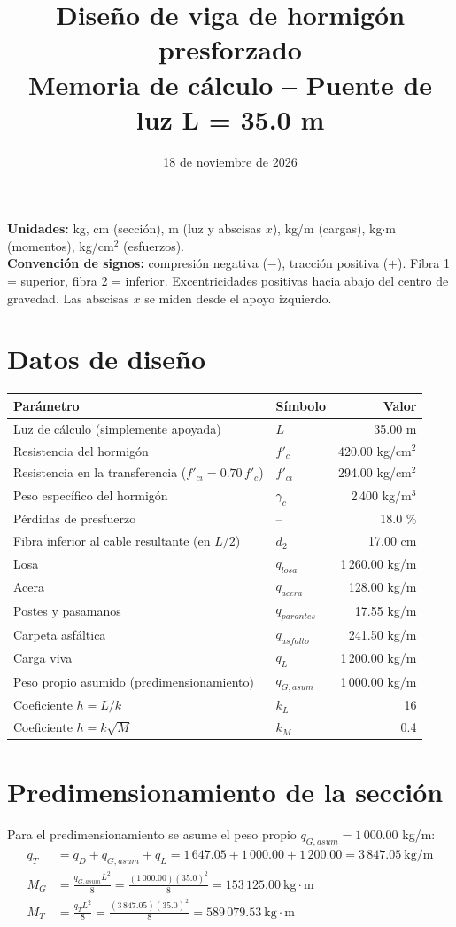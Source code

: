 \documentclass[11pt,a4paper]{article}
\title{\textbf{Diseño de viga de hormigón presforzado}\\[4pt]\large Memoria de cálculo -- Puente de luz L = 35.0 m}
\date{18 de noviembre de 2026}
\author{}
\begin{document}
\maketitle
\thispagestyle{fancy}
\tableofcontents
\newpage
\textbf{Unidades:} kg, cm (sección), m (luz y abscisas $x$), kg/m (cargas), kg$\cdot$m (momentos), kg/cm$^2$ (esfuerzos).\\
\textbf{Convención de signos:} compresión negativa ($-$), tracción positiva ($+$). Fibra 1 = superior, fibra 2 = inferior.
Excentricidades positivas hacia abajo del centro de gravedad. Las abscisas $x$ se miden desde el apoyo izquierdo.


\section{Datos de diseño}
\begin{center}
\begin{tabular}{llr}
\toprule
Parámetro & Símbolo & Valor \\
\midrule
Luz de cálculo (simplemente apoyada) & $L$ & 35.00 m \\
Resistencia del hormigón & $f'_c$ & 420.00 kg/cm$^2$ \\
Resistencia en la transferencia ($f'_{ci} = 0.70\,f'_c$) & $f'_{ci}$ & 294.00 kg/cm$^2$ \\
Peso específico del hormigón & $\gamma_c$ & 2\,400 kg/m$^3$ \\
Pérdidas de presfuerzo & -- & 18.0 \% \\
Fibra inferior al cable resultante (en $L/2$) & $d_2$ & 17.00 cm \\
\midrule
Losa & $q_{losa}$ & 1\,260.00 kg/m \\
Acera & $q_{acera}$ & 128.00 kg/m \\
Postes y pasamanos & $q_{parantes}$ & 17.55 kg/m \\
Carpeta asfáltica & $q_{asfalto}$ & 241.50 kg/m \\
Carga viva & $q_L$ & 1\,200.00 kg/m \\
\midrule
Peso propio asumido (predimensionamiento) & $q_{G,asum}$ & 1\,000.00 kg/m \\
Coeficiente $h = L/k$ & $k_L$ & 16 \\
Coeficiente $h = k\sqrt{M}$ & $k_M$ & 0.4 \\
\bottomrule
\end{tabular}
\end{center}


\section{Predimensionamiento de la sección}
Para el predimensionamiento se asume el peso propio $q_{G,asum} = 1\,000.00$ kg/m:
\begin{align*}
q_T &= q_D + q_{G,asum} + q_L = 1\,647.05 + 1\,000.00 + 1\,200.00 = 3\,847.05\ \text{kg/m}\\
M_G &= \frac{q_{G,asum} L^2}{8} = \frac{(1\,000.00)(35.0)^2}{8} = 153\,125.00\ \text{kg}\cdot\text{m}\\
M_T &= \frac{q_T L^2}{8} = \frac{(3\,847.05)(35.0)^2}{8} = 589\,079.53\ \text{kg}\cdot\text{m}
\end{align*}
\end{document}
